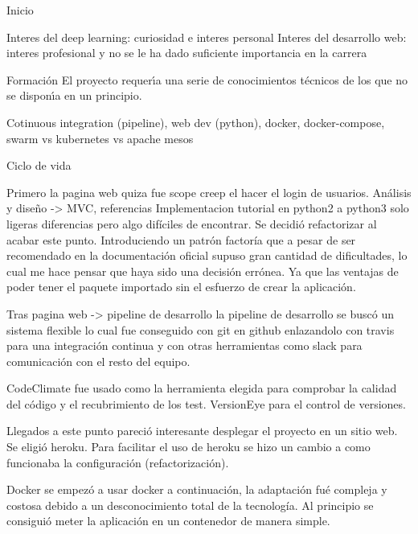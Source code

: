 
Inicio 

Interes del deep learning: curiosidad e interes personal
Interes del desarrollo web: interes profesional y no se le ha dado suficiente importancia en la carrera


Formación
El proyecto requerı́a una serie de conocimientos técnicos de los que no
se disponı́a en un principio.

Cotinuous integration (pipeline), web dev (python), docker, docker-compose, swarm vs kubernetes vs apache mesos




Ciclo de vida


Primero la pagina web quiza fue scope creep el hacer el login de usuarios.
Análisis y diseño -> MVC, referencias 
Implementacion tutorial en python2 a python3 solo ligeras diferencias pero algo difíciles de encontrar.
Se decidió refactorizar al acabar este punto. Introduciendo un patrón factoría que a pesar de ser recomendado en la documentación oficial supuso gran cantidad de dificultades, lo cual me hace pensar que haya sido una decisión errónea. Ya que las ventajas de poder tener el paquete importado sin el esfuerzo de crear la aplicación.

Tras pagina web -> pipeline de desarrollo
la pipeline de desarrollo se buscó un sistema flexible lo cual fue conseguido con git en github enlazandolo con travis para una integración continua y con otras herramientas como slack para comunicación con el resto del equipo.

CodeClimate fue usado como la herramienta elegida para comprobar la calidad del código y el recubrimiento de los test. VersionEye para el control de versiones.


Llegados a este punto pareció interesante desplegar el proyecto en un sitio web. Se eligió heroku. Para facilitar el uso de heroku se hizo un cambio a como funcionaba la configuración (refactorización). 

Docker se empezó a usar docker a continuación, la adaptación fué compleja y costosa debido a un desconocimiento total de la tecnología. Al principio se consiguió meter la aplicación en un contenedor de manera simple.


